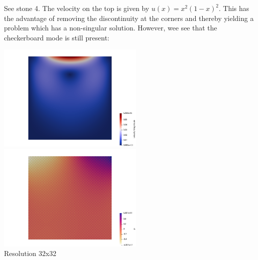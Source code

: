 See stone 4. The velocity on the top is given by $u(x)=x^2(1-x)^2$.
This has the advantage of removing the discontinuity at the corners and 
thereby yielding a problem which has a non-singular solution.
However, wee see that the checkerboard mode is still present:

\begin{center}
\includegraphics[width=7cm]{python_codes/fieldstone_12/results/rldc/vel}
\includegraphics[width=7cm]{python_codes/fieldstone_12/results/rldc/p}\\
{\captionfont Resolution 32x32}
\end{center}

